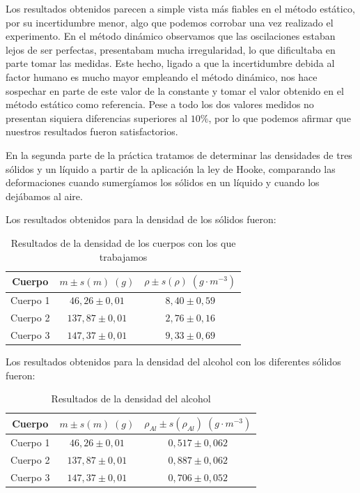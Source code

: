 \documentclass[a4paper,12pt,titlepage]{report}
\begin{document}
Los resultados obtenidos parecen a simple vista más fiables en el método estático, por su incertidumbre menor, algo que podemos corrobar una vez realizado el experimento. En el método dinámico observamos que las oscilaciones estaban lejos de ser perfectas, presentabam mucha irregularidad, lo que dificultaba en parte tomar las medidas. Este hecho, ligado a que la incertidumbre debida al factor humano es mucho mayor empleando el método dinámico, nos hace sospechar en parte de este valor de la constante y tomar el valor obtenido en el método estático como referencia. Pese a todo los dos valores medidos no presentan siquiera diferencias superiores al $10\%$, por lo que podemos afirmar que nuestros resultados fueron satisfactorios.

\par En la segunda parte de la práctica tratamos de determinar las densidades de tres sólidos y un líquido a partir de la aplicación la ley de Hooke, comparando las deformaciones cuando sumergíamos los sólidos en un líquido y cuando los dejábamos al aire. 

\par Los resultados obtenidos para la densidad de los sólidos fueron:

\begin{table}[h!]
    \centering
    \begin{tabular}{|c|c|c|}
        \hline
        Cuerpo & $m \pm s(m) \; (g)$ & $\rho \pm s(\rho) \; (g\cdot m^{-3})$ \\ \hline
        Cuerpo 1 & $46,26 \pm 0,01$ & $8,40 \pm 0,59$ \\ \hline
        Cuerpo 2 & $137,87 \pm 0,01$ & $2,76 \pm 0,16$\\ \hline
        Cuerpo 3 & $147,37 \pm 0,01$& $9,33 \pm 0,69$ \\ \hline
    \end{tabular}
    \caption{Resultados de la densidad de los cuerpos con los que trabajamos}
\end{table}

Los resultados obtenidos para la densidad del alcohol con los diferentes sólidos fueron:

\begin{table}[h!]
    \centering
    \begin{tabular}{|c|c|c|}
        \hline
        Cuerpo & $m \pm s(m) \; (g)$ & $\rho_{Al} \pm s(\rho_{Al}) \; (g\cdot m^{-3})$ \\ \hline
        Cuerpo 1 & $46,26 \pm 0,01$ & $0,517 \pm 0,062$ \\ \hline
        Cuerpo 2 & $137,87 \pm 0,01$ & $0,887 \pm 0,062$\\ \hline
        Cuerpo 3 & $147,37 \pm 0,01$& $0,706 \pm 0,052$ \\ \hline
    \end{tabular}
    \caption{Resultados de la densidad del alcohol}
\end{table}
\end{document}
